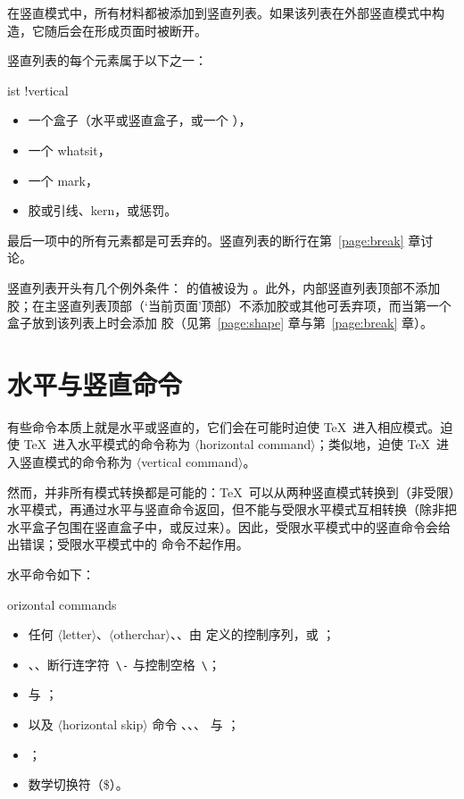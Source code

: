 \documentclass[a4paper]{rapport3}
\def\gr#1{$\langle$#1$\rangle$}\def\key#1{{\tt#1}}
\def\term#1\par{\index{#1}}
\begin{document}
在竖直模式中，所有材料都被添加到竖直列表。如果该列表在外部竖直模式中构造，它随后会在形成页面时被断开。

竖直列表的每个元素属于以下之一：
\term list !vertical\par
\begin{itemize} \item 一个盒子（水平或竖直盒子，或一个 ），
\item 一个 whatsit，
\item 一个 mark，
\item 胶或引线、kern，或惩罚。\end{itemize}
最后一项中的所有元素都是可丢弃的。竖直列表的断行在第~\ref{page:break} 章讨论。

竖直列表开头有几个例外条件： 的值被设为 \n{-1000pt}。此外，内部竖直列表顶部不添加  胶；在主竖直列表顶部（`当前页面'顶部）不添加胶或其他可丢弃项，而当第一个盒子放到该列表上时会添加  胶（见第~\ref{page:shape} 章与第~\ref{page:break} 章）。

\section{水平与竖直命令}

有些命令本质上就是水平或竖直的，它们会在可能时迫使 \TeX\ 进入相应模式。迫使 \TeX\ 进入水平模式的命令称为 \gr{horizontal command}；类似地，迫使 \TeX\ 进入竖直模式的命令称为
\awp
\gr{vertical command}。

然而，并非所有模式转换都是可能的：\TeX\ 可以从两种竖直模式转换到（非受限）水平模式，再通过水平与竖直命令返回，但不能与受限水平模式互相转换（除非把水平盒子包围在竖直盒子中，或反过来）。因此，受限水平模式中的竖直命令会给出错误；受限水平模式中的  命令不起作用。

水平命令如下：
\label{h:com:list}\term horizontal commands\par
\begin{itemize}
\item 任何 \gr{letter}、\gr{otherchar}、、由  定义的控制序列，或 ；
\item {}、、断行连字符~\verb|\-| 与控制空格~\verb|\|；
\item {} 与 ；
\item {} 以及
\gr{horizontal skip} 命令
、、、 与 ；
\item {}；
\item 数学切换符（\n\$）。
\end{itemize}
\end{document}
